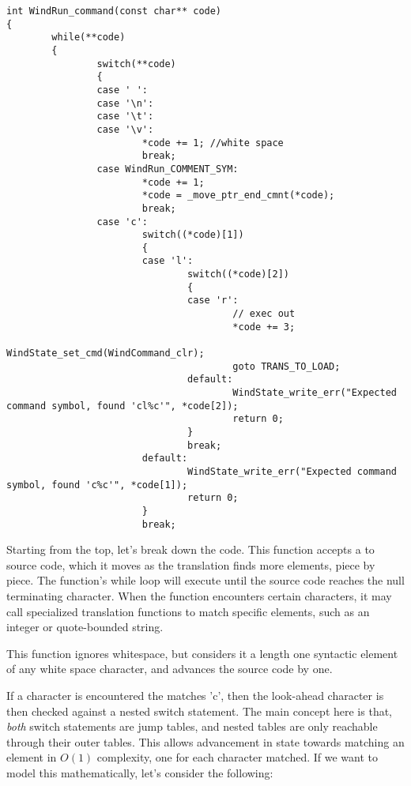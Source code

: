 \begin{lstlisting}[style=numc]
int WindRun_command(const char** code)
{
        while(**code)
        {
                switch(**code)
                {
                case ' ':
                case '\n':
                case '\t':
                case '\v':
                        *code += 1; //white space
                        break;
                case WindRun_COMMENT_SYM:
                        *code += 1;
                        *code = _move_ptr_end_cmnt(*code);
                        break;
                case 'c':
                        switch((*code)[1])
                        {
                        case 'l':
                                switch((*code)[2])
                                {
                                case 'r':
                                        // exec out
                                        *code += 3;
                                        WindState_set_cmd(WindCommand_clr);
                                        goto TRANS_TO_LOAD;
                                default:
                                        WindState_write_err("Expected command symbol, found 'cl%c'", *code[2]);
                                        return 0;
                                }
                                break;
                        default:
                                WindState_write_err("Expected command symbol, found 'c%c'", *code[1]);
                                return 0;
                        }
                        break;
\end{lstlisting}

\par Starting from the top, let's break down the code. This function accepts a  to source code, which it moves as the translation finds more elements, piece by piece. The function's while loop will execute until the source code reaches the null terminating character. When the function encounters certain characters, it may call specialized translation functions to match specific elements, such as an integer or quote-bounded string. 
\par This function ignores whitespace, but considers it a length one syntactic element of any white space character, and advances the source code by one.
\par If a character is encountered the matches 'c', then  the look-ahead character is then checked against a nested switch statement. The main concept here is that, \emph{both} switch statements are jump tables, and nested tables are only reachable through their outer tables. This allows advancement in state towards matching an element in $O(1)$ complexity, one for each character matched. If we want to model this mathematically, let's consider the following:

